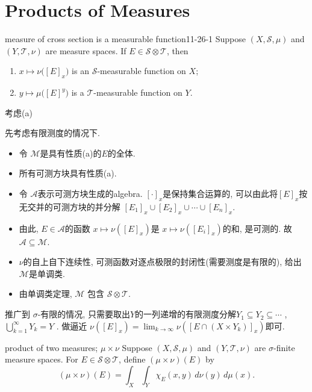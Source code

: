 \documentclass[../main.tex]{subfiles}
\begin{document}
\section{Products of Measures}
\begin{theorem}{measure of cross section is a measurable function}{11-26-1}
Suppose \((X,\mathcal{S},\mu)\) and \((Y,\mathcal{T},\nu)\) are  measure spaces. If \(E\in\mathcal{S}\otimes\mathcal{T}\), then

\begin{enumerate}
  \item \(x\mapsto \nu\bigl([E]_x\bigr)\) is an \(\mathcal{S}\)-measurable function on \(X\);
  \item \(y\mapsto \mu\bigl([E]^y\bigr)\) is a \(\mathcal{T}\)-measurable function on \(Y\).
\end{enumerate}
\end{theorem}

\begin{proofsketch}
  考虑(a)

  先考虑有限测度的情况下.
  \begin{itemize}
    \item 令 \(  \mathcal{M}  \)是具有性质(a)的\(  E  \)的全体.
    \item 所有可测方块具有性质(a).
    \item 令 \(  \mathcal{A}  \)表示可测方块生成的algebra. \(  [\cdot ]_{x}  \)是保持集合运算的, 可以由此将\(  [E]_{x}  \)按无交并的可测方块的并分解 \(  [E_1]_{x}\cup [E_2]_{x}\cup \cdots \cup [E_{n}]_{x}  \).     
    \item 由此, \(  E\in \mathcal{A}  \)的函数 \(  x\mapsto \nu \left( [E]_{x} \right)   \)是  \(  x\mapsto \nu \left( [E_{i}]_{x} \right)   \)的和, 是可测的. 故 \(  \mathcal{A}\subseteq \mathcal{M}  \).    
    \item \(  \nu   \)的自上自下连续性, 可测函数对逐点极限的封闭性(需要测度是有限的), 给出\(  \mathcal{M}  \)是单调类.  
    \item 由单调类定理, \(  \mathcal{M}  \) 包含 \(  \mathcal{S}\otimes \mathcal{T}  \). 
  \end{itemize}

  推广到 \(   \sigma   \)-有限的情况, 只需要取出\(  Y  \)的一列递增的有限测度分解\(  Y_1\subseteq Y_2\subseteq \cdots   \) ,\(  \bigcup _{k= 1}^{\infty}Y_{k}= Y  \)  . 做逼近 \(  \nu \left( [E]_{x} \right)= \lim_{k\to \infty}\nu \left( [E\cap \left( X\times Y_{k} \right) ]_{x} \right)    \)即可. 
  
\end{proofsketch}
\begin{definition}{product of two measures; \(\mu \times \nu\)}{}
Suppose \((X,\mathcal{S},\mu)\) and \((Y,\mathcal{T},\nu)\) are \(\sigma\)-finite measure spaces. For \(E \in \mathcal{S} \otimes \mathcal{T}\), define \((\mu \times \nu)(E)\) by
\[
(\mu \times \nu)(E) = \int_X \int_Y \chi_E(x,y)\, d\nu(y)\, d\mu(x).
\]
\end{definition}
\end{document}

